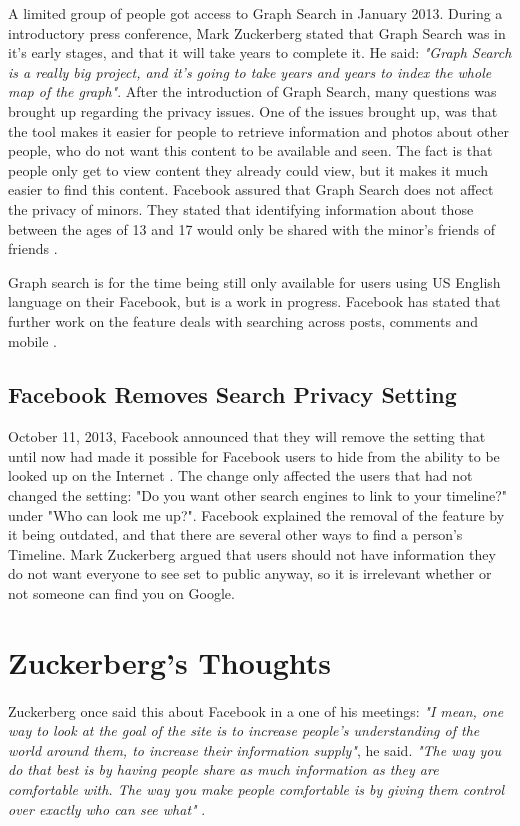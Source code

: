A limited group of people got access to Graph Search in January 2013. During a introductory press conference, Mark Zuckerberg stated that Graph Search was in it's early stages, and that it will take years to complete it. He said: \textit{"Graph Search is a really big project, and it's going to take years and years to index the whole map of the graph"}. After the introduction of Graph Search, many questions was brought up regarding the privacy issues. One of the issues brought up, was that the tool makes it easier for people to retrieve information and photos about other people, who do not want this content to be available and seen. The fact is that people only get to view content they already could view, but it makes it much easier to find this content. Facebook  assured that Graph Search does not affect the privacy of minors. They stated that identifying information about those between the ages of 13 and 17 would only be shared with the minor's friends of friends \cite{graphsearchcw}. 

Graph search is for the time being still only available for users using US English language on their Facebook, but is a work in progress. Facebook has stated that further work on the feature deals with searching across posts, comments and mobile \cite{graphsearchcw}. 


\subsection{Facebook Removes Search Privacy Setting}
October 11, 2013, Facebook announced that they will remove the setting that until now had made it possible for Facebook users to hide from the ability to be looked up on the Internet \cite{searchSetting}. The change only affected the users that had not changed the setting: "Do you want other search engines to link to your timeline?" under "Who can look me up?". Facebook explained the removal of the feature by it being outdated, and that there are several other ways to find a person's Timeline. Mark Zuckerberg argued that users should not have information they do not want everyone to see set to public anyway, so it is irrelevant whether or not someone can find you on Google. 
 

\section{Zuckerberg's Thoughts}

\paragraph{}
Zuckerberg once said this about Facebook in a one of his meetings: \textit{"I mean, one way to look at the goal of the site is to increase people’s understanding of the world around them, to increase their information supply"}, he said. \textit{"The way you do that best is by having people share as much information as they are comfortable with. The way you make people comfortable is by giving them control over exactly who can see what"} \cite{MeMedia}.

